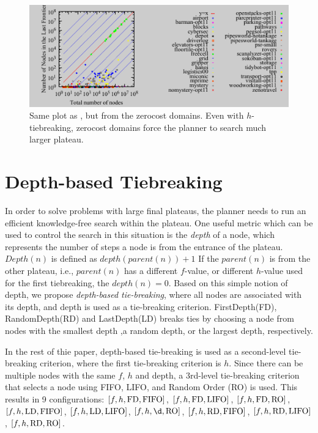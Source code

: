 \begin{figure}[htb]
 \centering {}
  \includegraphics{tables/aaai16-frontier/aaai16prelim3/lmcut_frontier-front.pdf}
  \caption{Same plot as , but from the zerocost
  domains. Even with $h$-tiebreaking, zerocost domains force the planner
  to search much larger plateau.}
 \label{plateau-zerocost}
\end{figure}



\section{Depth-based Tiebreaking}

In order to solve problems with large final plateaus, the
planner needs to run an efficient knowledge-free search within the
plateau.  One useful metric which can be used to control the search in this
situation is the \emph{depth} of a node, which represents the number 
of steps a node is from the entrance of the plateau.
$Depth(n)$ is defined as $depth(parent(n)) + 1$
If the $parent(n)$ is from the other plateau, i.e., $parent(n)$ has a different $f$-value, or different $h$-value used for the first
tiebreaking, the $depth(n) = 0$. 
Based on this simple notion of depth,
we propose  \emph{depth-based tie-breaking}, where all nodes are associated with its depth, 
and depth is used as a tie-breaking criterion.
FirstDepth(FD), RandomDepth(RD) and LastDepth(LD) breaks ties by choosing a node from 
nodes with the smallest depth ,a random depth, or the largest depth, respectively.

In the rest of thie paper, depth-based tie-breaking is used as a second-level tie-breaking criterion,
where the first tie-breaking criterion is $h$.
Since there can be multiple nodes with the same $f$, $h$ and depth,
a 3rd-level tie-breaking criterion that selects a node using FIFO, LIFO, and Random Order (RO) is used.
This results in 9 configurations:
$[f,h,\mbox{FD},\mbox{FIFO}]$, $[f,h,\mbox{FD},\mbox{LIFO}]$, $[f,h,\mbox{FD},\mbox{RO}]$, $[f,h,\mbox{LD},\mbox{FIFO}]$, $[f,h,\mbox{LD},\mbox{LIFO}]$, $[f,h,\d,\ro]$, $[f,h,\mbox{RD},\mbox{FIFO}]$, $[f,h,\mbox{RD},\mbox{LIFO}]$, $[f,h,\mbox{RD},\mbox{RO}]$.

